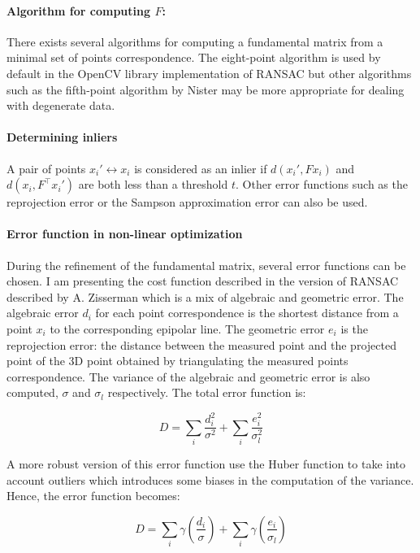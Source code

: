 \documentclass[12pt]{article}
\begin{document}
\paragraph{Algorithm for computing $F$:}

There exists several algorithms for computing a fundamental matrix from a minimal set of points correspondence. The eight-point algorithm is used by default in the OpenCV library implementation of RANSAC but other algorithms such as the fifth-point algorithm by Nister\cite{FivePointNister04} may be more appropriate for dealing with degenerate data.

\paragraph{Determining inliers}

A pair of points $x_i' \leftrightarrow x_i$ is considered as an inlier if $d(x_i', Fx_i)$ and  $d(x_i, F^\top x_i')$ are both less than a threshold $t$. Other error functions such as the reprojection error or the Sampson approximation error can also be used.

\paragraph{Error function in non-linear optimization}

During the refinement of the fundamental matrix, several error functions can be chosen. I am presenting the cost function described in the version of RANSAC described by A. Zisserman\cite{Ransac97} which is a mix of algebraic and geometric error. The algebraic error $d_i$ for each point correspondence is the shortest distance from a point $x_i$ to the corresponding epipolar line. The geometric error $e_i$ is the reprojection error: the distance between the measured point and the projected point of the 3D point obtained by triangulating the measured points correspondence. The variance of the algebraic and geometric error is also computed, $\sigma$ and $\sigma_l$ respectively. The total error function is:

\[
    D = \sum_i \frac{d_i^2}{\sigma^2} + \sum_i \frac{e_i^2}{\sigma_l^2}
\]

A more robust version of this error function use the Huber function to take into account outliers which introduces some biases in the computation of the variance. Hence, the error function becomes:

\[
    D = \sum_i \gamma(\frac{d_i}{\sigma}) + \sum_i \gamma(\frac{e_i}{\sigma_l})
\]
\end{document}

